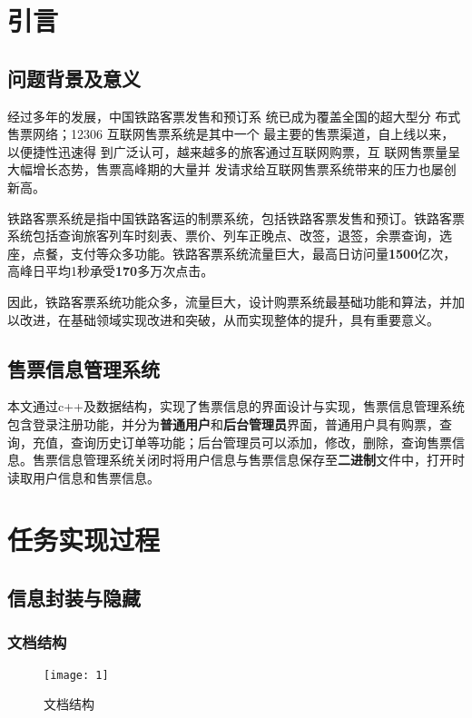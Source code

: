 \documentclass{apmcmthesis}
\begin{document}





\newpage
\tableofcontents


\newpage
\setcounter{page}{1}
\section{引言}
\subsection{问题背景及意义}
经过多年的发展，中国铁路客票发售和预订系
统已成为覆盖全国的超大型分
布式售票网络；12306 互联网售票系统是其中一个
最主要的售票渠道，自上线以来，以便捷性迅速得
到广泛认可，越来越多的旅客通过互联网购票，互
联网售票量呈大幅增长态势，售票高峰期的大量并
发请求给互联网售票系统带来的压力也屡创新高。\cite{1}

铁路客票系统是指中国铁路客运的制票系统，包括铁路客票发售和预订。铁路客票系统包括查询旅客列车时刻表、票价、列车正晚点、改签，退签，余票查询，选座，点餐，支付等众多功能。铁路客票系统流量巨大，最高日访问量\textbf{1500}亿次，高峰日平均1秒承受\textbf{170}多万次点击。
 
 因此，铁路客票系统功能众多，流量巨大，设计购票系统最基础功能和算法，并加以改进，在基础领域实现改进和突破，从而实现整体的提升，具有重要意义。


\subsection{售票信息管理系统}
本文通过c++及数据结构，实现了售票信息的界面设计与实现，售票信息管理系统包含登录注册功能，并分为\textbf{普通用户}和\textbf{后台管理员}界面，普通用户具有购票，查询，充值，查询历史订单等功能；后台管理员可以添加，修改，删除，查询售票信息。售票信息管理系统关闭时将用户信息与售票信息保存至\textbf{二进制}文件中，打开时读取用户信息和售票信息。





\section{任务实现过程}


\subsection{信息封装与隐藏}
\subsubsection{文档结构}
\begin{figure}[htbp]


\texttt{[image: 1]}
\caption{文档结构}
\end{figure}
\end{document}
